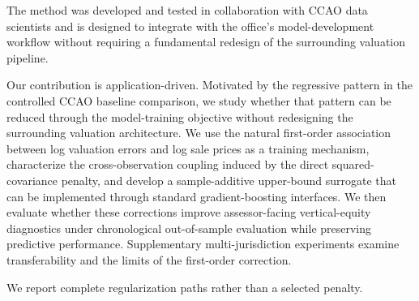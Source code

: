 \documentclass[10pt]{article}
\theoremstyle{definition}
\newcommand{\1}{\mathbf{1}}
\begin{document}
{The method was developed and tested in collaboration with CCAO data scientists and is designed to integrate with the office's model-development workflow without requiring a fundamental redesign of the surrounding valuation pipeline.}




\textcolor{impGreen}{Our contribution is application-driven. Motivated by the regressive pattern in the controlled CCAO baseline comparison, we study whether that pattern can be reduced through the model-training objective without redesigning the surrounding valuation architecture. We use the natural first-order association between log valuation errors and log sale prices as a training mechanism, characterize the cross-observation coupling induced by the direct squared-covariance penalty, and develop a sample-additive upper-bound surrogate that can be implemented through standard gradient-boosting interfaces. We then evaluate whether these corrections improve assessor-facing vertical-equity diagnostics under chronological out-of-sample evaluation while preserving predictive performance. Supplementary multi-jurisdiction experiments examine transferability and the limits of the first-order correction.}

We report complete regularization paths rather than a selected penalty.
\end{document}
